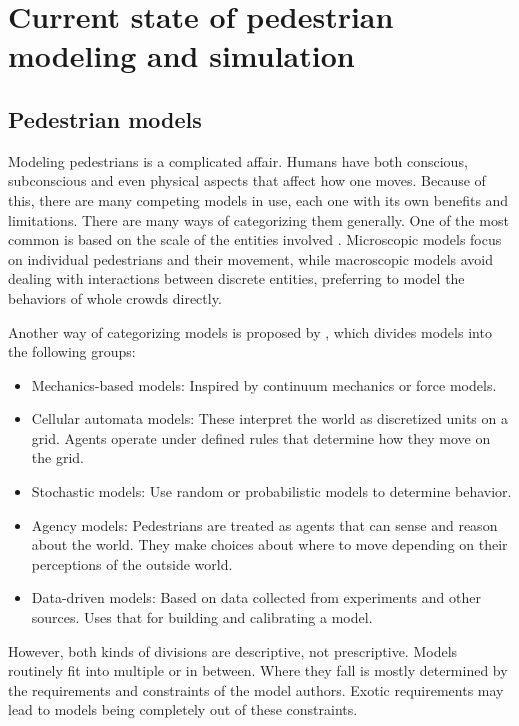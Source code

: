 \documentclass[twoside, 11pt]{article}
\begin{document}
\section{Current state of pedestrian modeling and simulation} \label{sec:overview}

\subsection{Pedestrian models}

Modeling pedestrians is a complicated affair. Humans have both conscious, subconscious and even physical aspects that affect how one moves. Because of this, there are many competing models in use, each one with its own benefits and limitations. There are many ways of categorizing them generally. One of the most common is based on the scale of the entities involved \cite{kleinmeierVadereOpenSourceSimulation2019}. Microscopic models focus on individual pedestrians and their movement, while macroscopic models avoid dealing with interactions between discrete entities, preferring to model the behaviors of whole crowds directly.

Another way of categorizing models is proposed by \cite{martinez-gilModelingEvaluationScale2017}, which divides models into the following groups:

\begin{itemize}
  \item Mechanics-based models: Inspired by continuum mechanics or force models.
  \item Cellular automata models: These interpret the world as discretized units on a grid. Agents operate under defined rules that determine how they move on the grid.
  \item Stochastic models: Use random or probabilistic models to determine behavior.
  \item Agency models: Pedestrians are treated as agents that can sense and reason about the world. They make choices about where to move depending on their perceptions of the outside world.
  \item Data-driven models: Based on data collected from experiments and other sources. Uses that for building and calibrating a model.
\end{itemize}

However, both kinds of divisions are descriptive, not prescriptive. Models routinely fit into multiple or in between. Where they fall is mostly determined by the requirements and constraints of the model authors. Exotic requirements may lead to models being completely out of these constraints.
\end{document}
